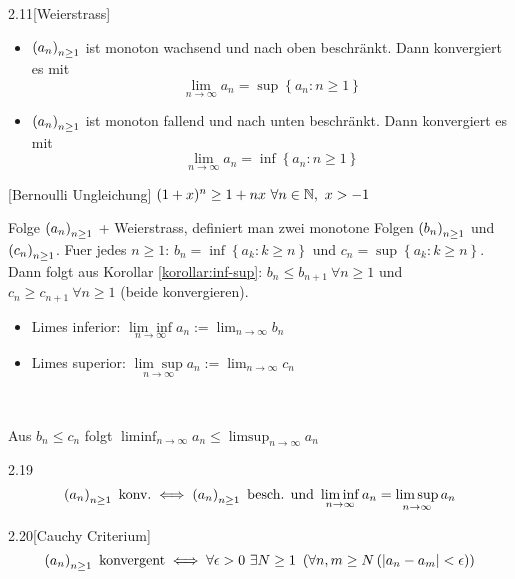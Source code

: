 \begin{satz}{2.11}[Weierstrass]
    \begin{itemize}
        \item $\left( a_n \right)_{n \ge 1}$ ist monoton wachsend und nach oben beschränkt. Dann konvergiert es mit \[ \lim_{n \to \infty} a_n = \sup \left\{ a_n : n \ge 1 \right\} \]
        \item $\left( a_n \right)_{n \ge 1}$ ist monoton fallend und nach unten beschränkt. Dann konvergiert es mit \[ \lim_{n \to \infty} a_n = \inf \left\{ a_n : n \ge 1 \right\} \]
    \end{itemize}
\end{satz}

\begin{lemma}{}[Bernoulli Ungleichung]
    $(1 + x)^n \ge 1 + nx\ \forall n \in \mathbb{N},\ x > -1$
\end{lemma}

\begin{definition}
    Folge $\left( a_n \right)_{n \ge 1}$ + Weierstrass, definiert man zwei monotone Folgen $\left( b_n \right)_{n \ge 1}$ und $\left( c_n \right)_{n \ge 1}$.
    Fuer jedes $n \ge 1$: $b_n = \inf \left\{ a_k : k \ge n \right\}$ und $c_n = \sup \left\{ a_k : k \ge n \right\}$.
    Dann folgt aus Korollar \ref{korollar:inf-sup}:
    $b_n \le b_{n + 1}\ \forall n \ge 1$ und $c_n \ge c_{n + 1}\ \forall n \ge 1$ (beide konvergieren).

    \begin{itemize}
        \item Limes inferior: $\underset{n \to \infty}{\lim \inf} a_n := \lim_{n \to \infty} b_n$
        \item Limes superior: $\underset{n \to \infty}{\lim \sup} a_n := \lim_{n \to \infty} c_n$
    \end{itemize}\

    Aus $b_n \le c_n$ folgt $\liminf_{n \to \infty} a_n \le \limsup_{n \to \infty} a_n$
\end{definition}

\begin{lemma}{2.19}
    \[
        \left( a_n \right)_{n \ge 1}\ \mbox{konv.} \iff \left( a_n \right)_{n \ge 1}\ \mbox{besch. und}\ \liminf_{n \to \infty} a_n = \limsup_{n \to \infty} a_n
    \]
\end{lemma}

\begin{satz}{2.20}[Cauchy Criterium]
    \label{satz:cauchy-criterium-folge}
    \[ \left( a_n \right)_{n \ge 1}\ \mbox{konvergent} \iff \forall \epsilon > 0\
        \exists N \ge 1\ \left( \forall n,m \ge N \left( \lvert a_n - a_m \rvert < \epsilon \right) \right) \]
\end{satz}

